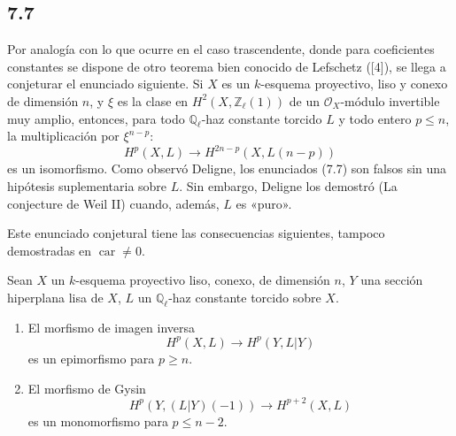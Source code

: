 \subsection*{7.7}

Por analogía con lo que ocurre en el caso trascendente, donde para coeficientes constantes se dispone de otro teorema bien conocido de Lefschetz ([4]), se llega a conjeturar el enunciado siguiente. Si $X$ es un $k$-esquema proyectivo, liso y conexo de dimensión $n$, y $\xi$ es la clase en $H^2(X,\mathbb Z_\ell(1))$ de un $\mathcal O_X$-módulo invertible muy amplio, entonces, para todo $\mathbb Q_\ell$-haz constante torcido $L$ y todo entero $p\le n$, la multiplicación por $\xi^{n-p}$:
\[
H^p(X,L)\to H^{2n-p}(X,L(n-p))
\]
es un isomorfismo. Como observó Deligne, los enunciados (7.7) son falsos sin una hipótesis suplementaria sobre $L$. Sin embargo, Deligne los demostró (La conjecture de Weil II) cuando, además, $L$ es «puro».

Este enunciado conjetural tiene las consecuencias siguientes, tampoco demostradas en $\operatorname{car}\ne0$.

Sean $X$ un $k$-esquema proyectivo liso, conexo, de dimensión $n$, $Y$ una sección hiperplana lisa de $X$, $L$ un $\mathbb Q_\ell$-haz constante torcido sobre $X$.
\begin{enumerate}[label=(\roman*)]
\item El morfismo de imagen inversa
\[
H^p(X,L)\to H^p(Y,L|Y)
\]
es un epimorfismo para $p\ge n$.
\item El morfismo de Gysin
\[
H^p(Y,(L|Y)(-1))\to H^{p+2}(X,L)
\]
es un monomorfismo para $p\le n-2$.
\end{enumerate}
